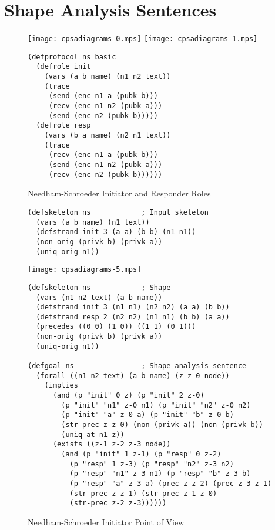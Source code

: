 \documentclass[12pt]{article}
\begin{document}
\section{Shape Analysis Sentences}\label{sec:sas}

\begin{figure}
\begin{center}
\texttt{[image: cpsadiagrams-0.mps]}\hfil
\texttt{[image: cpsadiagrams-1.mps]}\\
\end{center}
\begin{center}
\begin{minipage}{3in}
\begin{verbatim}
(defprotocol ns basic
  (defrole init
    (vars (a b name) (n1 n2 text))
    (trace
     (send (enc n1 a (pubk b)))
     (recv (enc n1 n2 (pubk a)))
     (send (enc n2 (pubk b)))))
  (defrole resp
    (vars (b a name) (n2 n1 text))
    (trace
     (recv (enc n1 a (pubk b)))
     (send (enc n1 n2 (pubk a)))
     (recv (enc n2 (pubk b))))))
\end{verbatim}
\end{minipage}
\end{center}
\caption{Needham-Schroeder Initiator and Responder Roles}
\label{fig:ns roles}
\end{figure}

\begin{figure}
\begin{verbatim}
(defskeleton ns            ; Input skeleton
  (vars (a b name) (n1 text))
  (defstrand init 3 (a a) (b b) (n1 n1))
  (non-orig (privk b) (privk a))
  (uniq-orig n1))
\end{verbatim}
\begin{center}
\texttt{[image: cpsadiagrams-5.mps]}
\end{center}
\begin{verbatim}
(defskeleton ns            ; Shape
  (vars (n1 n2 text) (a b name))
  (defstrand init 3 (n1 n1) (n2 n2) (a a) (b b))
  (defstrand resp 2 (n2 n2) (n1 n1) (b b) (a a))
  (precedes ((0 0) (1 0)) ((1 1) (0 1)))
  (non-orig (privk b) (privk a))
  (uniq-orig n1))

(defgoal ns                ; Shape analysis sentence
  (forall ((n1 n2 text) (a b name) (z z-0 node))
    (implies
      (and (p "init" 0 z) (p "init" 2 z-0)
        (p "init" "n1" z-0 n1) (p "init" "n2" z-0 n2)
        (p "init" "a" z-0 a) (p "init" "b" z-0 b)
        (str-prec z z-0) (non (privk a)) (non (privk b))
        (uniq-at n1 z))
      (exists ((z-1 z-2 z-3 node))
        (and (p "init" 1 z-1) (p "resp" 0 z-2)
          (p "resp" 1 z-3) (p "resp" "n2" z-3 n2)
          (p "resp" "n1" z-3 n1) (p "resp" "b" z-3 b)
          (p "resp" "a" z-3 a) (prec z z-2) (prec z-3 z-1)
          (str-prec z z-1) (str-prec z-1 z-0)
          (str-prec z-2 z-3))))))
\end{verbatim}
\caption{Needham-Schroeder Initiator Point of View}
\label{fig:ns init}
\end{figure}
\end{document}

